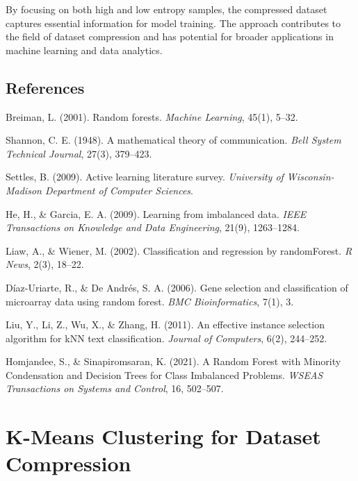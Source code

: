 \documentclass{article}
\begin{document}
By focusing on both high and low entropy samples, the compressed dataset captures essential information for model training. The approach contributes to the field of dataset compression and has potential for broader applications in machine learning and data analytics.

\subsection{References}

\begin{thebibliography}{9}

Breiman, L. (2001).
\newblock Random forests.
\newblock \textit{Machine Learning}, 45(1), 5–32.

Shannon, C. E. (1948).
\newblock A mathematical theory of communication.
\newblock \textit{Bell System Technical Journal}, 27(3), 379–423.

Settles, B. (2009).
\newblock Active learning literature survey.
\newblock \textit{University of Wisconsin-Madison Department of Computer Sciences}.

He, H., \& Garcia, E. A. (2009).
\newblock Learning from imbalanced data.
\newblock \textit{IEEE Transactions on Knowledge and Data Engineering}, 21(9), 1263–1284.

Liaw, A., \& Wiener, M. (2002).
\newblock Classification and regression by randomForest.
\newblock \textit{R News}, 2(3), 18–22.

D{\'i}az-Uriarte, R., \& De Andr{\'e}s, S. A. (2006).
\newblock Gene selection and classification of microarray data using random forest.
\newblock \textit{BMC Bioinformatics}, 7(1), 3.

Liu, Y., Li, Z., Wu, X., \& Zhang, H. (2011).
\newblock An effective instance selection algorithm for kNN text classification.
\newblock \textit{Journal of Computers}, 6(2), 244–252.

Homjandee, S., \& Sinapiromsaran, K. (2021).
\newblock A Random Forest with Minority Condensation and Decision Trees for Class Imbalanced Problems.
\newblock \textit{WSEAS Transactions on Systems and Control}, 16, 502–507.

\end{thebibliography}


\section{K-Means Clustering for Dataset Compression}
\end{document}
